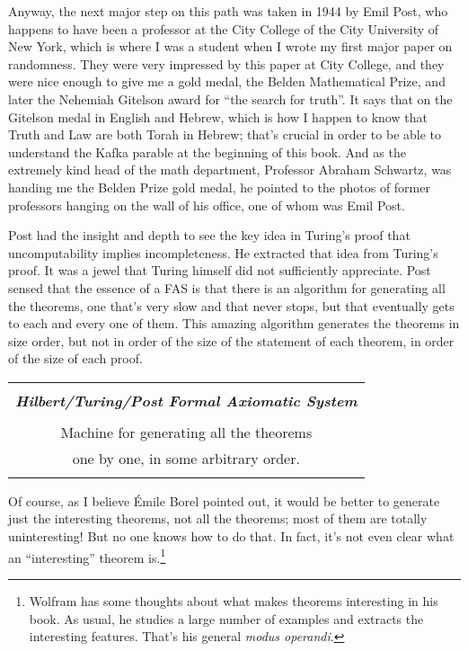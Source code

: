 \documentclass[12pt]{book}
\begin{document}
Anyway, the next major step on this path was taken in 1944 by Emil Post, who happens to have
been a professor at the City College of the City University of New York, which is where I was
a student when I wrote my first major paper on randomness.  They were very impressed by this
paper at City College, and they were nice enough to give me a gold medal, the Belden Mathematical
Prize, and later the Nehemiah Gitelson award for ``the search for truth''. 
It says that on the Gitelson medal in English and Hebrew, which is how I happen to know that
Truth and Law are both Torah in Hebrew; 
that's crucial in order to be able to understand
the Kafka parable at the beginning of this book.  
And as the extremely kind head of the math department, Professor Abraham Schwartz, 
was handing me the
Belden Prize gold medal, he pointed to the photos of former professors hanging on
the wall of his office, one of whom was Emil Post.

Post had the insight and depth to see the key idea in Turing's proof that uncomputability
implies incompleteness.  He extracted that idea from Turing's proof.  It was a jewel that
Turing himself did not sufficiently appreciate.  Post sensed that the essence of a FAS
is that there is an algorithm for generating all the theorems, one that's very slow and
that never stops, but that eventually gets to each and every one of them.  This amazing 
algorithm generates the theorems in size order, but not in order of the size of the statement
of each theorem, in order of the size of each proof.

\begin{center}
\begin{tabular}{|c|}
\hline
\\
\textbf{\emph{\large Hilbert/Turing/Post Formal Axiomatic System}}
\\
\\
Machine for generating all the theorems
\\
one by one, in some arbitrary order.
\\
\\
\hline
\end{tabular}
\end{center}

Of course, as I believe \'Emile Borel pointed out, it would be better to generate just
the interesting theorems, not all the theorems; most of them are totally uninteresting!
But no one knows how to do that. In fact, it's not even clear what an ``interesting''
theorem is.\footnote{Wolfram has some thoughts about what makes theorems interesting in his book.
As usual, he studies a large number of examples and extracts the interesting features.
That's his general \emph{modus operandi}.}
\end{document}

